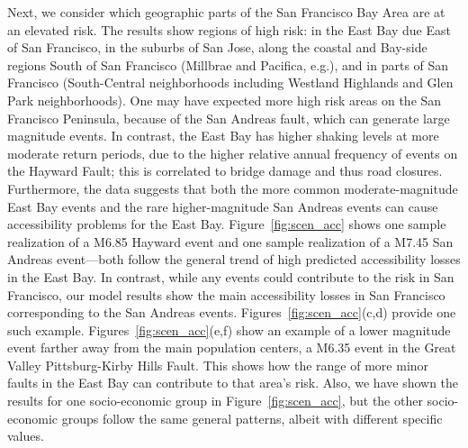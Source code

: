 Next, we consider which geographic parts of the San Francisco Bay Area are at an elevated risk. The results show regions of high risk: in the East Bay due East of San Francisco, in the suburbs of San Jose, along the coastal and Bay-side regions South of San Francisco (Millbrae and Pacifica, e.g.), and in parts of San Francisco (South-Central neighborhoods including Westland Highlands and Glen Park neighborhoods). One may have expected more high risk areas on the San Francisco Peninsula, because of the San Andreas fault, which can generate large magnitude events. In contrast, the East Bay has higher shaking levels at more moderate return periods, due to the higher relative annual frequency of events on the Hayward Fault; this is correlated to bridge damage and thus road closures. Furthermore, the data suggests that both the more common moderate-magnitude East Bay events and the rare higher-magnitude San Andreas events can cause accessibility problems for the East Bay. Figure~\ref{fig:scen_acc} shows one sample realization of a M6.85 Hayward event and one sample realization of a M7.45 San Andreas event---both follow the general trend of  high predicted accessibility losses in the East Bay.
In contrast, while any events could contribute to the risk in San Francisco, our model results show the main accessibility losses in San Francisco corresponding to the San Andreas events.
Figures~\ref{fig:scen_acc}{(c,d)} provide one such example. Figures~\ref{fig:scen_acc}{(e,f)} show an example of a lower magnitude event farther away from the main population centers, a M6.35 event in the Great Valley Pittsburg-Kirby Hills Fault. This shows how the range of more minor faults in the East Bay can contribute to that area's risk.
Also, we have shown the results for one socio-economic group in Figure~\ref{fig:scen_acc}, but the other socio-economic groups follow the same general patterns, albeit with different specific values.


